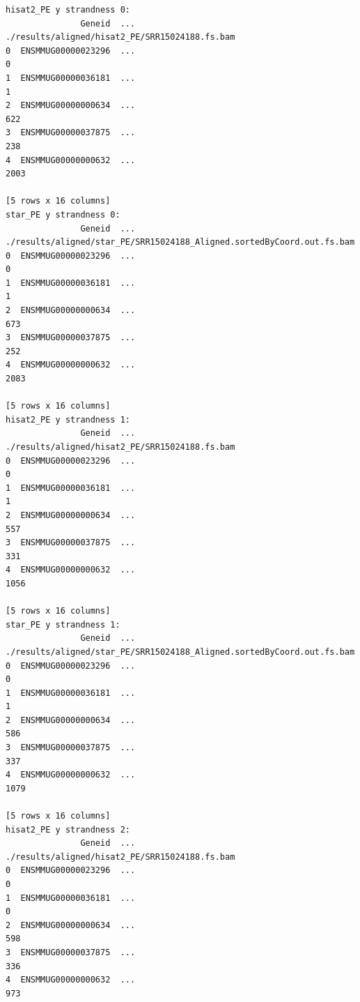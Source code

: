 \documentclass[
  12pt,
  letterpaper,
  DIV=11,
  numbers=noendperiod]{scrartcl}
\begin{document}
\begin{verbatim}
hisat2_PE y strandness 0:
               Geneid  ... ./results/aligned/hisat2_PE/SRR15024188.fs.bam
0  ENSMMUG00000023296  ...                                              0
1  ENSMMUG00000036181  ...                                              1
2  ENSMMUG00000000634  ...                                            622
3  ENSMMUG00000037875  ...                                            238
4  ENSMMUG00000000632  ...                                           2003

[5 rows x 16 columns]
star_PE y strandness 0:
               Geneid  ... ./results/aligned/star_PE/SRR15024188_Aligned.sortedByCoord.out.fs.bam
0  ENSMMUG00000023296  ...                                                  0                    
1  ENSMMUG00000036181  ...                                                  1                    
2  ENSMMUG00000000634  ...                                                673                    
3  ENSMMUG00000037875  ...                                                252                    
4  ENSMMUG00000000632  ...                                               2083                    

[5 rows x 16 columns]
hisat2_PE y strandness 1:
               Geneid  ... ./results/aligned/hisat2_PE/SRR15024188.fs.bam
0  ENSMMUG00000023296  ...                                              0
1  ENSMMUG00000036181  ...                                              1
2  ENSMMUG00000000634  ...                                            557
3  ENSMMUG00000037875  ...                                            331
4  ENSMMUG00000000632  ...                                           1056

[5 rows x 16 columns]
star_PE y strandness 1:
               Geneid  ... ./results/aligned/star_PE/SRR15024188_Aligned.sortedByCoord.out.fs.bam
0  ENSMMUG00000023296  ...                                                  0                    
1  ENSMMUG00000036181  ...                                                  1                    
2  ENSMMUG00000000634  ...                                                586                    
3  ENSMMUG00000037875  ...                                                337                    
4  ENSMMUG00000000632  ...                                               1079                    

[5 rows x 16 columns]
hisat2_PE y strandness 2:
               Geneid  ... ./results/aligned/hisat2_PE/SRR15024188.fs.bam
0  ENSMMUG00000023296  ...                                              0
1  ENSMMUG00000036181  ...                                              0
2  ENSMMUG00000000634  ...                                            598
3  ENSMMUG00000037875  ...                                            336
4  ENSMMUG00000000632  ...                                            973


\end{verbatim}
\end{document}
